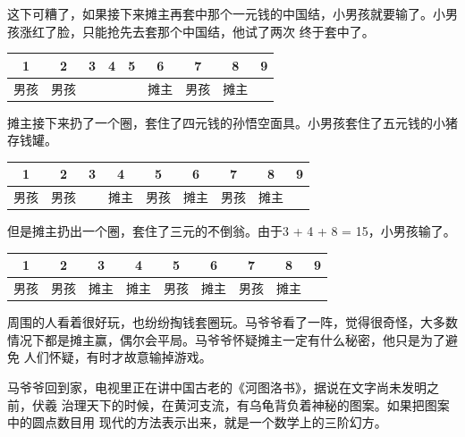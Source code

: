 \documentclass[UTF8]{article}
\begin{document}
这下可糟了，如果接下来摊主再套中那个一元钱的中国结，小男孩就要输了。小男孩涨红了脸，只能抢先去套那个中国结，他试了两次
终于套中了。

\vspace{5mm}
\begin{tabular}{|c|c|c|c|c|c|c|c|c|}
\hline
1 & 2 & 3 & 4 & 5 & 6 & 7 & 8 & 9 \\
\hline
男孩  & 男孩  &   &   &   & 摊主  & 男孩 & 摊主 & \\
\hline
\end{tabular}
\vspace{5mm}

摊主接下来扔了一个圈，套住了四元钱的孙悟空面具。小男孩套住了五元钱的小猪存钱罐。

\vspace{5mm}
\begin{tabular}{|c|c|c|c|c|c|c|c|c|}
\hline
1 & 2 & 3 & 4 & 5 & 6 & 7 & 8 & 9 \\
\hline
男孩  & 男孩  &   & 摊主  & 男孩  & 摊主  & 男孩 & 摊主 & \\
\hline
\end{tabular}
\vspace{5mm}

但是摊主扔出一个圈，套住了三元的不倒翁。由于3 + 4 + 8 = 15，小男孩输了。

\vspace{5mm}
\begin{tabular}{|c|c|c|c|c|c|c|c|c|}
\hline
1 & 2 & 3 & 4 & 5 & 6 & 7 & 8 & 9 \\
\hline
男孩  & 男孩  & 摊主  & 摊主  & 男孩  & 摊主  & 男孩 & 摊主 & \\
\hline
\end{tabular}
\vspace{5mm}

周围的人看着很好玩，也纷纷掏钱套圈玩。马爷爷看了一阵，觉得很奇怪，大多数
情况下都是摊主赢，偶尔会平局。马爷爷怀疑摊主一定有什么秘密，他只是为了避免
人们怀疑，有时才故意输掉游戏。

马爷爷回到家，电视里正在讲中国古老的《河图洛书》，据说在文字尚未发明之前，伏羲
治理天下的时候，在黄河支流，有乌龟背负着神秘的图案。如果把图案中的圆点数目用
现代的方法表示出来，就是一个数学上的三阶幻方。
\end{document}
